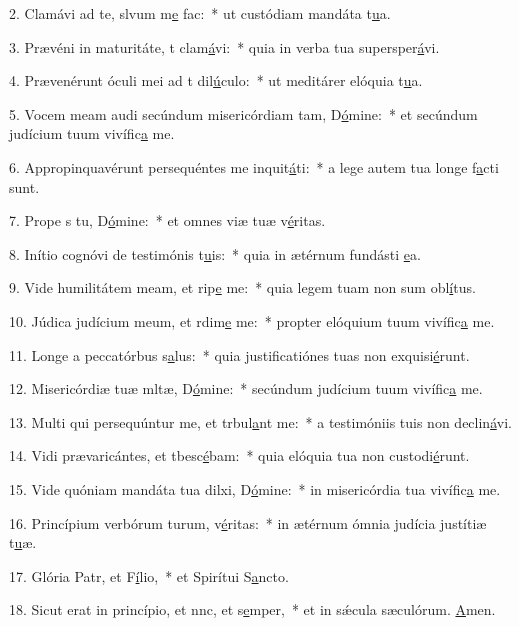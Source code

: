2. Clamávi ad te, slvum m\uline{e} fac:~* ut custódiam mandáta t\uline{u}a.\par 
3. Prævéni in maturitáte, t clam\uline{á}vi:~* quia in verba tua supersper\uline{á}vi.\par 
4. Prævenérunt óculi mei ad t dil\uline{ú}culo:~* ut meditárer elóquia t\uline{u}a.\par 
5. Vocem meam audi secúndum misericórdiam tam, D\uline{ó}mine:~* et secúndum judícium tuum vivífic\uline{a} me.\par 
6. Appropinquavérunt persequéntes me inquit\uline{á}ti:~* a lege autem tua longe f\uline{a}cti sunt.\par 
7. Prope s tu, D\uline{ó}mine:~* et omnes viæ tuæ v\uline{é}ritas.\par 
8. Inítio cognóvi de testimónis t\uline{u}is:~* quia in ætérnum fundásti \uline{e}a.\par 
9. Vide humilitátem meam, et rip\uline{e} me:~* quia legem tuam non sum obl\uline{í}tus.\par 
10. Júdica judícium meum, et rdim\uline{e} me:~* propter elóquium tuum vivífic\uline{a} me.\par 
11. Longe a peccatórbus s\uline{a}lus:~* quia justificatiónes tuas non exquisi\uline{é}runt.\par 
12. Misericórdiæ tuæ mltæ, D\uline{ó}mine:~* secúndum judícium tuum vivífic\uline{a} me.\par 
13. Multi qui persequúntur me, et trbul\uline{a}nt me:~* a testimóniis tuis non declin\uline{á}vi.\par 
14. Vidi prævaricántes, et tbesc\uline{é}bam:~* quia elóquia tua non custodi\uline{é}runt.\par 
15. Vide quóniam mandáta tua dilxi, D\uline{ó}mine:~* in misericórdia tua vivífic\uline{a} me.\par 
16. Princípium verbórum turum, v\uline{é}ritas:~* in ætérnum ómnia judícia justítiæ t\uline{u}æ.\par 
17. Glória Patr, et F\uline{í}lio,~* et Spirítui S\uline{a}ncto.\par 
18. Sicut erat in princípio, et nnc, et s\uline{e}mper,~* et in sǽcula sæculórum. \uline{A}men.\par 

